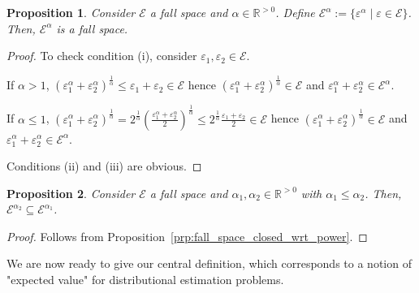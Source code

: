\documentclass{article}
\theoremstyle{definition}
\theoremstyle{plain}
\newtheorem{proposition}{Proposition}[section]
\newcommand{\Reals}{\mathbb{R}}
\begin{document}
\begin{proposition}

Consider $\mathcal{E}$ a fall space and $\alpha \in \Reals^{>0}$. Define ${\mathcal{E}^\alpha := \{\varepsilon^\alpha \mid \varepsilon \in \mathcal{E}\}}$. Then, $\mathcal{E}^\alpha$ is a fall space.

\end{proposition}

\begin{proof}

To check condition (i), consider $\varepsilon_1, \varepsilon_2 \in \mathcal{E}$. 

If $\alpha > 1$, $(\varepsilon_1^\alpha + \varepsilon_2^\alpha)^\frac{1}{\alpha} \leq \varepsilon_1 + \varepsilon_2 \in \mathcal{E}$ hence $(\varepsilon_1^\alpha + \varepsilon_2^\alpha)^\frac{1}{\alpha} \in \mathcal{E}$ and $\varepsilon_1^\alpha + \varepsilon_2^\alpha \in \mathcal{E}^\alpha$.

If $\alpha \leq 1$, $(\varepsilon_1^\alpha + \varepsilon_2^\alpha)^\frac{1}{\alpha} = 2^\frac{1}{\alpha}(\frac{\varepsilon_1^\alpha + \varepsilon_2^\alpha}{2})^\frac{1}{\alpha} \leq 2^\frac{1}{\alpha} \frac{\varepsilon_1+\varepsilon_2}{2} \in \mathcal{E}$ hence $(\varepsilon_1^\alpha + \varepsilon_2^\alpha)^\frac{1}{\alpha} \in \mathcal{E}$ and $\varepsilon_1^\alpha + \varepsilon_2^\alpha \in \mathcal{E}^\alpha$.

Conditions (ii) and (iii) are obvious.

\end{proof}

\begin{proposition}

Consider $\mathcal{E}$ a fall space and $\alpha_1,\alpha_2 \in \Reals^{>0}$ with $\alpha_1 \leq \alpha_2$. Then, ${\mathcal{E}^{\alpha_2} \subseteq \mathcal{E}^{\alpha_1}}$.

\end{proposition}

\begin{proof}

Follows from Proposition~\ref{prp:fall_space_closed_wrt_power}.

\end{proof}

We are now ready to give our central definition, which corresponds to a notion of "expected value" for distributional estimation problems.
\end{document}
